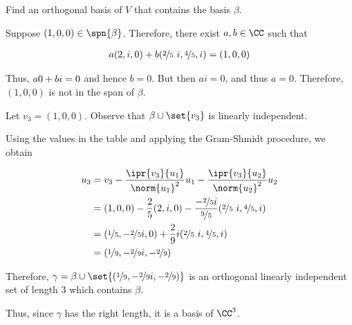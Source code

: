 \documentclass[11pt]{scrartcl}
\begin{document}
\begin{problem*}
Find an orthogonal basis of $V$ that contains the basis $\beta$.
\end{problem*}

\begin{soln}
  Suppose $(1, 0, 0)\in\spn{\beta}$. Therefore, there exist
  $a, b\in\CC$ such that

  \begin{align}
a (2,i, 0) + b (\nicefrac{2}{5}\ i,\nicefrac{4}{5}, i) = (1, 0, 0)
  \end{align}

  Thus, $a\*0 + bi =0$ and hence $b = 0$. But then $ai = 0$, and thus
  $a=0$. Therefore, $(1, 0, 0)$ is not in the span of $\beta$.

  Let $v_3=(1, 0, 0)$. Observe that $\beta \cup \set{v_3}$ is linearly
  independent.

  Using the values in the table and applying the Gram-Shmidt procedure, we obtain

  
  \begin{align*}
    u_3 & = v_3 - \frac{\ipr{v_3}{u_1}}{\norm{u_{1}}^{2}}u_1 - \frac{\ipr{v_{3}}{u_2}}{\norm{u_{2}}^2}u_2                         \\
        & = (1, 0, 0) - \frac{2}{5}(2, i, 0) - \frac{- \nicefrac{2}{5}i }{\nicefrac{9}{5}}(\nicefrac{2}{5}\ i,\nicefrac{4}{5}, i) \\
        & =(\nicefrac{1}{5}, -\nicefrac{2}{5}i, 0) + \frac{2}{9}i(\nicefrac{2}{5}\ i,\nicefrac{4}{5}, i)                          \\
        & =(\nicefrac{1}{9}, -\nicefrac{2}{9}i, -\nicefrac{2}{9})
  \end{align*}

  Therefore, $\gamma = \beta \cup \set{(\nicefrac{1}{9}, -\nicefrac{2}{9}i, -\nicefrac{2}{9})}$ is an orthogonal linearly independent set of length 3 which contains $\beta$.

  Thus, since $\gamma$ has the right length, it is a basis of $\CC^3$.
\end{soln}
\end{document}
